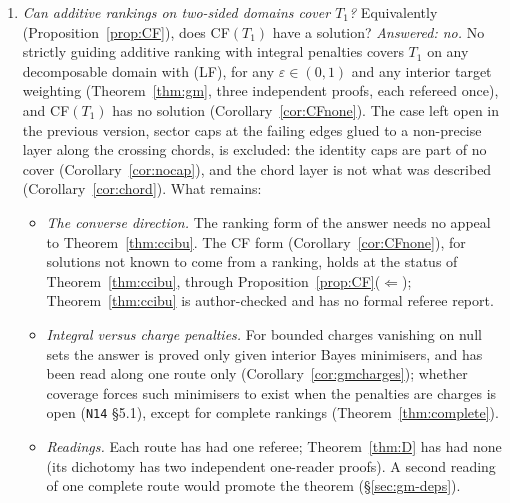 \documentclass[11pt]{article}
\theoremstyle{definition}
\theoremstyle{remark}
\newcommand{\src}[1]{\texttt{#1}}
\begin{document}
\begin{enumerate}[leftmargin=*,label=\textbf{(Q\arabic*)}]
\item \emph{Can additive rankings on two-sided domains cover $T_1$?} Equivalently (Proposition~\ref{prop:CF}), does CF$(T_1)$ have a solution? \emph{Answered: no.} No strictly guiding additive ranking with integral penalties covers $T_1$ on any decomposable domain with (LF), for any $\varepsilon\in(0,1)$ and any interior target weighting (Theorem~\ref{thm:gm}, three independent proofs, each refereed once), and CF$(T_1)$ has no solution (Corollary~\ref{cor:CFnone}). The case left open in the previous version, sector caps at the failing edges glued to a non-precise layer along the crossing chords, is excluded: the identity caps are part of no cover (Corollary~\ref{cor:nocap}), and the chord layer is not what was described (Corollary~\ref{cor:chord}). What remains:
\begin{itemize}[leftmargin=*]
\item \emph{The converse direction.} The ranking form of the answer needs no appeal to Theorem~\ref{thm:ccibu}. The CF form (Corollary~\ref{cor:CFnone}), for solutions not known to come from a ranking, holds at the status of Theorem~\ref{thm:ccibu}, through Proposition~\ref{prop:CF}($\Leftarrow$); Theorem~\ref{thm:ccibu} is author-checked and has no formal referee report.
\item \emph{Integral versus charge penalties.} For bounded charges vanishing on null sets the answer is proved only given interior Bayes minimisers, and has been read along one route only (Corollary~\ref{cor:gmcharges}); whether coverage forces such minimisers to exist when the penalties are charges is open (\src{N14} \S5.1), except for complete rankings (Theorem~\ref{thm:complete}).
\item \emph{Readings.} Each route has had one referee; Theorem~\ref{thm:D} has had none (its dichotomy has two independent one-reader proofs). A second reading of one complete route would promote the theorem (\S\ref{sec:gm-deps}).
\end{itemize}
\end{enumerate}
\end{document}
